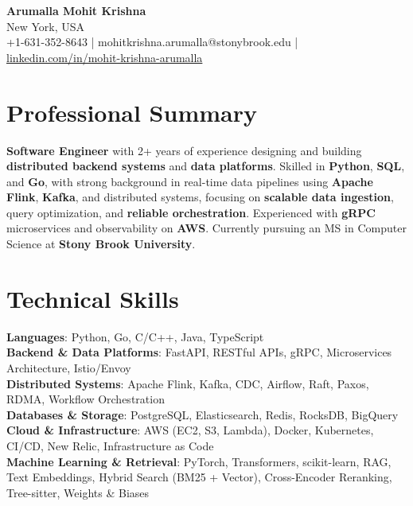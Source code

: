 \documentclass[letterpaper,11pt]{article}
\begin{document}
\begin{center}
  {\Large \textbf{Arumalla Mohit Krishna}} \\
  New York, USA \\
  +1-631-352-8643 \enspace | \enspace mohitkrishna.arumalla@stonybrook.edu \enspace | \enspace \href{https://www.linkedin.com/in/mohit-krishna-arumalla}{linkedin.com/in/mohit-krishna-arumalla}
\end{center}

\section{Professional Summary}
  \begin{itemize}[leftmargin=0.15in, label={}]
    \small{\item{
     \textbf{Software Engineer} with 2+ years of experience designing and building \textbf{distributed backend systems} and \textbf{data platforms}. Skilled in \textbf{Python}, \textbf{SQL}, and \textbf{Go}, with strong background in real-time data pipelines using \textbf{Apache Flink}, \textbf{Kafka}, and distributed systems, focusing on \textbf{scalable data ingestion}, query optimization, and \textbf{reliable orchestration}. Experienced with \textbf{gRPC} microservices and observability on \textbf{AWS}. Currently pursuing an MS in Computer Science at \textbf{Stony Brook University}.
    }}
  \end{itemize}
\vspace{-16pt}

\section{Technical Skills}
 \begin{itemize}[leftmargin=0.15in, label={}]
    \small{\item{
     \textbf{Languages}: Python, Go, C/C++, Java, TypeScript \\
     \textbf{Backend \& Data Platforms}: FastAPI, RESTful APIs, gRPC, Microservices Architecture, Istio/Envoy \\
     \textbf{Distributed Systems}: Apache Flink, Kafka, CDC, Airflow, Raft, Paxos, RDMA, Workflow Orchestration \\
     \textbf{Databases \& Storage}: PostgreSQL, Elasticsearch, Redis, RocksDB, BigQuery \\
     \textbf{Cloud \& Infrastructure}: AWS (EC2, S3, Lambda), Docker, Kubernetes, CI/CD, New Relic, Infrastructure as Code \\
     \textbf{Machine Learning \& Retrieval}: PyTorch, Transformers, scikit-learn, RAG, Text Embeddings, Hybrid Search (BM25 + Vector), Cross-Encoder Reranking, Tree-sitter, Weights \& Biases
    }}
 \end{itemize}
\vspace{-16pt}
\end{document}
